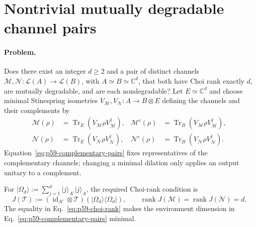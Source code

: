 \section{Nontrivial mutually degradable channel pairs}
\label{sec:op_7920f48995bc8511}

\paragraph{Problem.}
Does there exist an integer $d\geq2$ and a pair of distinct channels
$\mathcal M,\mathcal N:\mathcal L(A)\to\mathcal L(B)$, with
$A\simeq B\simeq\mathbb C^d$, that both have Choi rank exactly $d$, are
mutually degradable, and are each nondegradable?  Let
$E\simeq\mathbb C^d$ and choose minimal Stinespring isometries
$V_{\mathcal M},V_{\mathcal N}:A\to B\otimes E$ defining the channels and
their complements by
\begin{equation}
  \begin{aligned}
    \mathcal M(\rho)&=\operatorname{Tr}_E
      (V_{\mathcal M}\rho V_{\mathcal M}^{\dagger}),
    &\mathcal M^c(\rho)&=\operatorname{Tr}_B
      (V_{\mathcal M}\rho V_{\mathcal M}^{\dagger}),\\
    \mathcal N(\rho)&=\operatorname{Tr}_E
      (V_{\mathcal N}\rho V_{\mathcal N}^{\dagger}),
    &\mathcal N^c(\rho)&=\operatorname{Tr}_B
      (V_{\mathcal N}\rho V_{\mathcal N}^{\dagger}).
  \end{aligned}
  \label{eq:p59-complementary-pairs}
\end{equation}
Equation~\eqref{eq:p59-complementary-pairs} fixes representatives of the
complementary channels; changing a minimal dilation only applies an output
unitary to a complement.

For
$\lvert\Omega_d\rangle:=\sum_{j=1}^d\lvert j\rangle_{A'}\lvert j\rangle_A$,
the required Choi-rank condition is
\begin{equation}
  J(\mathcal T):=(\operatorname{id}_{A'}\otimes\mathcal T)
    (\lvert\Omega_d\rangle\!\langle\Omega_d\rvert),
  \qquad
  \operatorname{rank}J(\mathcal M)
   =\operatorname{rank}J(\mathcal N)=d.
  \label{eq:p59-choi-rank}
\end{equation}
The equality in Eq.~\eqref{eq:p59-choi-rank} makes the environment dimension
in Eq.~\eqref{eq:p59-complementary-pairs} minimal.

